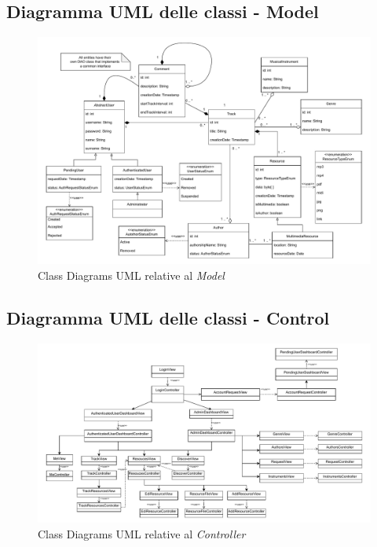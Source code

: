 \documentclass[a4paper]{article}
\begin{document}
\subsection{Diagramma UML delle classi - Model}
\begin{figure}[H]
    \centering
    \includegraphics[width=1.1 \textwidth]{./figures/uml_table_model}
    \caption{Class Diagrams UML relative al \textit{Model}}
    \label{fig:uml_table_model}
\end{figure}

\subsection{Diagramma UML delle classi - Control}
\begin{figure}[H]
    \centering
    \includegraphics[width=1.1 \textwidth]{./figures/uml_table_controller}
    \caption{Class Diagrams UML relative al \textit{Controller}}
    \label{fig:uml_table_controller}
\end{figure}
\end{document}
